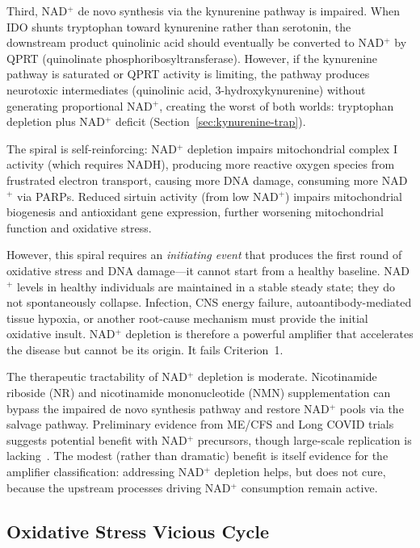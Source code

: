 Third, NAD$^+$ de novo synthesis via the kynurenine pathway is impaired. When IDO shunts tryptophan toward kynurenine rather than serotonin, the downstream product quinolinic acid should eventually be converted to NAD$^+$ by QPRT (quinolinate phosphoribosyltransferase). However, if the kynurenine pathway is saturated or QPRT activity is limiting, the pathway produces neurotoxic intermediates (quinolinic acid, 3-hydroxykynurenine) without generating proportional NAD$^+$, creating the worst of both worlds: tryptophan depletion plus NAD$^+$ deficit (Section~\ref{sec:kynurenine-trap}).

The spiral is self-reinforcing: NAD$^+$ depletion impairs mitochondrial complex I activity (which requires NADH), producing more reactive oxygen species from frustrated electron transport, causing more DNA damage, consuming more NAD$^+$ via PARPs. Reduced sirtuin activity (from low NAD$^+$) impairs mitochondrial biogenesis and antioxidant gene expression, further worsening mitochondrial function and oxidative stress.

However, this spiral requires an \emph{initiating event} that produces the first round of oxidative stress and DNA damage---it cannot start from a healthy baseline. NAD$^+$ levels in healthy individuals are maintained in a stable steady state; they do not spontaneously collapse. Infection, CNS energy failure, autoantibody-mediated tissue hypoxia, or another root-cause mechanism must provide the initial oxidative insult. NAD$^+$ depletion is therefore a powerful amplifier that accelerates the disease but cannot be its origin. It fails Criterion~1.

The therapeutic tractability of NAD$^+$ depletion is moderate. Nicotinamide riboside (NR) and nicotinamide mononucleotide (NMN) supplementation can bypass the impaired de novo synthesis pathway and restore NAD$^+$ pools via the salvage pathway. Preliminary evidence from ME/CFS and Long COVID trials suggests potential benefit with NAD$^+$ precursors, though large-scale replication is lacking~\cite{Rekeland2024}. The modest (rather than dramatic) benefit is itself evidence for the amplifier classification: addressing NAD$^+$ depletion helps, but does not cure, because the upstream processes driving NAD$^+$ consumption remain active.


\subsection{Oxidative Stress Vicious Cycle}
\label{sec:amp-oxidative}


